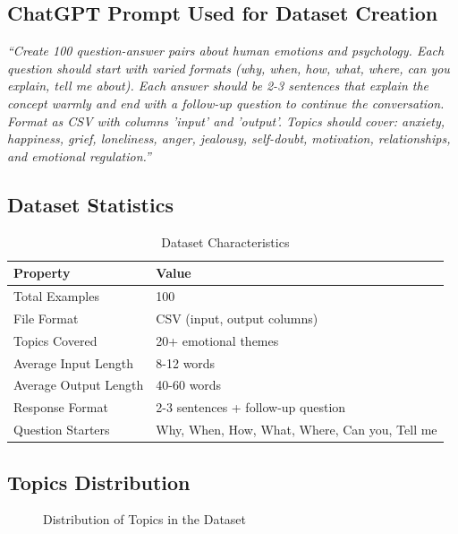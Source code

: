 \documentclass[12pt,a4paper]{article}
\begin{document}
\subsection{ChatGPT Prompt Used for Dataset Creation}

\begin{tcolorbox}[colback=yellow!5!white,colframe=yellow!75!black,title=Dataset Generation Prompt]
\small
\textit{``Create 100 question-answer pairs about human emotions and psychology. Each question should start with varied formats (why, when, how, what, where, can you explain, tell me about). Each answer should be 2-3 sentences that explain the concept warmly and end with a follow-up question to continue the conversation. Format as CSV with columns 'input' and 'output'. Topics should cover: anxiety, happiness, grief, loneliness, anger, jealousy, self-doubt, motivation, relationships, and emotional regulation.''}
\end{tcolorbox}

\subsection{Dataset Statistics}

\begin{table}[H]
\centering
\caption{Dataset Characteristics}
\begin{tabular}{ll}
\toprule
\textbf{Property} & \textbf{Value} \\
\midrule
Total Examples & 100 \\
File Format & CSV (input, output columns) \\
Topics Covered & 20+ emotional themes \\
Average Input Length & 8-12 words \\
Average Output Length & 40-60 words \\
Response Format & 2-3 sentences + follow-up question \\
Question Starters & Why, When, How, What, Where, Can you, Tell me \\
\bottomrule
\end{tabular}
\end{table}

\subsection{Topics Distribution}

\begin{figure}[H]
\centering
{}
\caption{Distribution of Topics in the Dataset}
\end{figure}
\end{document}
